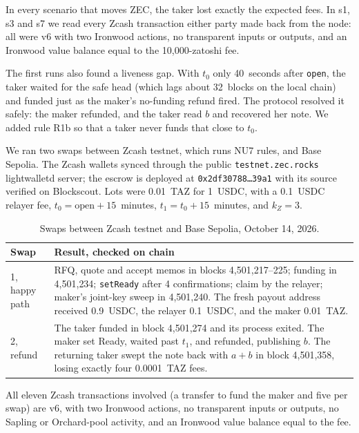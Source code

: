 \documentclass[10pt,letterpaper]{article}
\makeatletter
\renewcommand\subsection{\@startsection{subsection}{2}{\z@}{-0.9em}{0.25em}{\normalfont\normalsize\bfseries}}
\newcommand{\fn}[1]{\texttt{#1}}
\newcommand{\hx}[1]{\texttt{\small #1}}
\makeatother
\begin{document}
In every scenario that moves ZEC, the taker lost exactly the expected fees. In s1, s3 and s7 we read
every Zcash transaction either party made back from the node: all were v6 with two Ironwood actions,
no transparent inputs or outputs, and an Ironwood value balance equal to the 10{,}000-zatoshi fee.

The first runs also found a liveness gap. With $t_0$ only 40~seconds after \fn{open}, the taker
waited for the safe head (which lags about 32~blocks on the local chain) and funded just as the
maker's no-funding refund fired. The protocol resolved it safely: the maker refunded, and the taker
read $b$ and recovered her note. We added rule R1b so that a taker never funds that close to $t_0$.

\subsection{Public networks}
We ran two swaps between Zcash testnet, which runs NU7 rules, and Base Sepolia. The Zcash wallets
synced through the public \fn{testnet.zec.rocks} lightwalletd server; the escrow is deployed at
\hx{0x2df30788\ldots39a1} with its source verified on Blockscout. Lots were 0.01~TAZ for 1~USDC,
with a 0.1~USDC relayer fee, $t_0 = \text{open} + 15$~minutes, $t_1 = t_0 + 15$~minutes, and
$k_Z = 3$.

\begin{table}[H]
\centering\small
\begin{tabularx}{\linewidth}{@{}lX@{}}
\toprule
\textbf{Swap} & \textbf{Result, checked on chain}\\
\midrule
1, happy path & RFQ, quote and accept memos in blocks 4{,}501{,}217--225; funding in 4{,}501{,}234; \fn{setReady} after 4 confirmations; claim by the relayer; maker's joint-key sweep in 4{,}501{,}240. The fresh payout address received 0.9~USDC, the relayer 0.1~USDC, and the maker 0.01~TAZ.\\
2, refund & The taker funded in block 4{,}501{,}274 and its process exited. The maker set Ready, waited past $t_1$, and refunded, publishing $b$. The returning taker swept the note back with $a+b$ in block 4{,}501{,}358, losing exactly four 0.0001~TAZ fees.\\
\bottomrule
\end{tabularx}
\caption{Swaps between Zcash testnet and Base Sepolia, October 14, 2026.}
\end{table}

All eleven Zcash transactions involved (a transfer to fund the maker and five per swap) are v6, with
two Ironwood actions, no transparent inputs or outputs, no Sapling or Orchard-pool activity, and an
Ironwood value balance equal to the fee.
\end{document}
